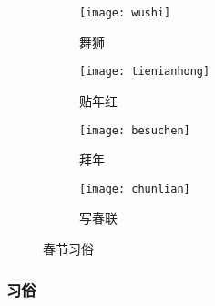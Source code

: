 \begin{figure}[htb]
    \centering 
    \begin{subfigure}[t]{0.48\linewidth}
    \centering
    \texttt{[image: wushi]}
    \caption{舞狮}        
    \end{subfigure}
    \begin{subfigure}[t]{0.48\linewidth}
        \centering
    \texttt{[image: tienianhong]}
    \caption{贴年红}        
    \end{subfigure}

    \begin{subfigure}[t]{0.48\linewidth}
        \centering
    \texttt{[image: besuchen]}
    \caption{拜年}        
    \end{subfigure}
    \begin{subfigure}[t]{0.48\linewidth}
        \centering
    \texttt{[image: chunlian]}
    \caption{写春联}        
    \end{subfigure}
    \caption{春节习俗} 
\end{figure}
\subsubsection{习俗}

